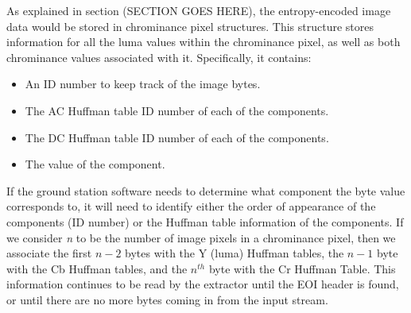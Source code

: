 As explained in section (SECTION GOES HERE), the entropy-encoded
image data would be stored in chrominance pixel structures. This structure
stores information for all the luma values within the chrominance pixel, 
as well as both chrominance values associated with it. Specifically, it contains:
\begin{itemize}
	\item An ID number to keep track of the image bytes.
	\item The AC Huffman table ID number of each of the components.
	\item The DC Huffman table ID number of each of the components.
	\item The value of the component.
\end{itemize}
If the ground station software needs to determine what 
component the byte value corresponds to, it will need to identify either 
the order of appearance of the components (ID number) or the 
Huffman table information of the components.
If we consider \emph{n} to be the number of image pixels in a chrominance pixel, then 
we associate the first $n - 2$ bytes with the Y (luma) Huffman tables, the $n - 1$ byte with the Cb Huffman tables, and 
the $n^{th}$ byte with the Cr Huffman Table. 
This information continues to be read by the extractor 
until the EOI header is found, or until there are no more bytes coming in from the input stream.



